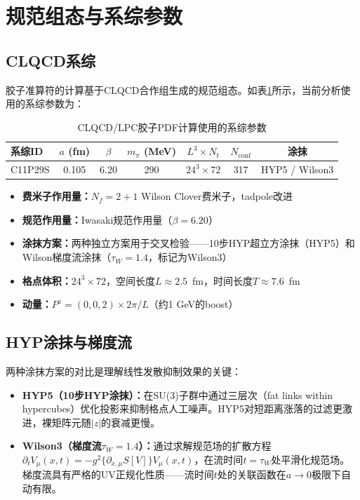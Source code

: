 \documentclass[12pt,a4paper]{ctexart}
\theoremstyle{definition}
\begin{document}
\section{规范组态与系综参数}

\subsection{CLQCD系综}

胶子准算符的计算基于CLQCD合作组生成的规范组态\cite{NoteGluonPDFs,Chen2025gluon}。如表\ref{tab:ensemble}所示，当前分析使用的系综参数为：

\begin{table}[H]
\centering
\caption{CLQCD/LPC胶子PDF计算使用的系综参数\cite{NoteGluonPDFs}}
\label{tab:ensemble}
\begin{tabular}{lcccccc}
\toprule
系综ID & $a$ (fm) & $\beta$ & $m_\pi$ (MeV) & $L^3\times N_t$ & $N_{\text{conf}}$ & 涂抹 \\
\midrule
C11P29S & 0.105 & 6.20 & 290 & $24^3\times72$ & 317 & HYP5 / Wilson3 \\
\bottomrule
\end{tabular}
\end{table}

\begin{itemize}
    \item \textbf{费米子作用量：}$N_f=2+1$ Wilson Clover费米子，tadpole改进\cite{CLQCD2024,CLQCD2025}
    \item \textbf{规范作用量：}Iwasaki规范作用量（$\beta=6.20$）
    \item \textbf{涂抹方案：}两种独立方案用于交叉检验——10步HYP超立方涂抹（HYP5）和Wilson梯度流涂抹（$\tau_W=1.4$，标记为Wilson3）\cite{NoteGluonPDFs}
    \item \textbf{格点体积：}$24^3\times72$，空间长度$L\approx2.5$~fm，时间长度$T\approx7.6$~fm
    \item \textbf{动量：}$P^z=(0,0,2)\times 2\pi/L$（约1 GeV的boost）
\end{itemize}

\subsection{HYP涂抹与梯度流}

两种涂抹方案的对比是理解线性发散抑制效果的关键\cite{NoteGluonPDFs}：

\begin{itemize}
    \item \textbf{HYP5（10步HYP涂抹）：}在SU(3)子群中通过三层次（fat links within hypercubes）优化投影来抑制格点人工噪声。HYP5对短距离涨落的过滤更激进，裸矩阵元随$|z|$的衰减更慢。
    \item \textbf{Wilson3（梯度流$\tau_W=1.4$）：}通过求解规范场的扩散方程$\partial_t V_\mu(x,t)=-g^2\{\partial_{x,\mu}S[V]\}V_\mu(x,t)$，在流时间$t=\tau_W$处平滑化规范场。梯度流具有严格的UV正规化性质——流时间$t$处的关联函数在$a\to0$极限下自动有限。
\end{itemize}
\end{document}
